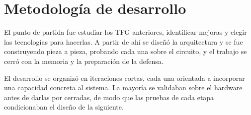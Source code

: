%
%
%

\section{Metodología de desarrollo}
\label{sec:metodoloxia}

El punto de partida fue estudiar los TFG anteriores, %
identificar mejoras y elegir las tecnologías para hacerlas. 
A partir de ahí se diseñó la arquitectura y se fue construyendo pieza a pieza, probando cada una sobre el circuito, y el trabajo se cerró con la memoria y la preparación de la defensa.

El desarrollo se organizó en iteraciones cortas, cada una orientada a incorporar una capacidad concreta al sistema. La mayoría se validaban sobre el hardware antes de darlas por cerradas, de modo que las pruebas de cada etapa condicionaban el diseño de la siguiente.

